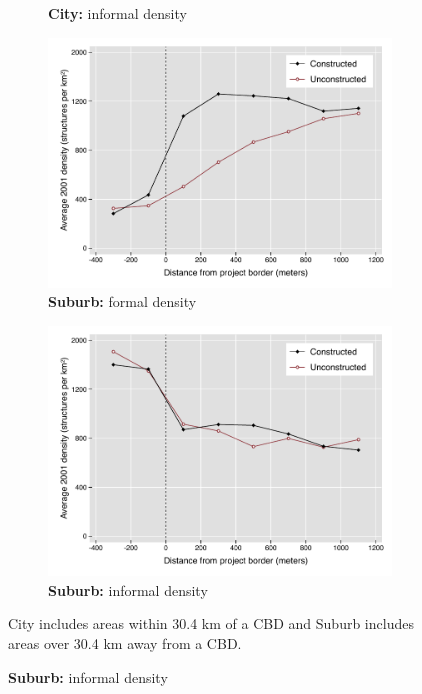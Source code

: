 \documentclass[12pt]{article}
\begin{document}
\begin{figure}[h!]
\begin{subfigure}[b]{0.495\textwidth}
            \caption[]%
            {{\small \textbf{City:} informal density}}    
            \label{fig:preinf_near_het}
        \end{subfigure}
        \begin{subfigure}[b]{0.495\textwidth}
            \centering
            \includegraphics[width=\textwidth,trim={0.3cm .3cm 0.1cm 0cm}, clip=true]{figures/bblu_for_pre_means_het_far_3.pdf}
            \caption[Network2]%
            {{\small \textbf{Suburb:} formal density}}    
            \label{fig:prefor_far_het}
        \end{subfigure}
        \hfill
        \begin{subfigure}[b]{0.495\textwidth}  
            \centering 
            \includegraphics[width=\textwidth,trim={0.3cm .3cm 0.1cm 0cm}, clip=true]{figures/bblu_inf_pre_means_het_far_3.pdf}
            \caption[]%
            {{\small \textbf{Suburb:} informal density}}    
            \label{fig:preinf_far_het}
        \end{subfigure}
        \label{fig:rawbblumeans_het}
        \vspace{-6mm}
    {\scriptsize City includes areas within 30.4 km of a CBD and Suburb includes areas over 30.4 km away from a CBD.}
    \end{figure} 
\end{document}
